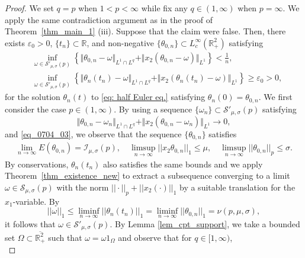 \documentclass[11pt]{amsart}
\theoremstyle{definition}
\theoremstyle{definition}
\numberwithin{equation}{section}
\newcommand{\nrm}[1]{\Vert#1\Vert}
\newcommand{\set}[1]{\{#1\}}
\newcommand{\0}{\emptyset}
\newcommand{\tht}{\theta}
\newcommand{\omg}{\omega}
\newcommand{\bbR}{\mathbb R}
\newcommand{\calI}{\mathcal I}
\newcommand{\calS}{\mathcal S}
\newcommand{\ift}{\infty}
\begin{document}
			
			
			\begin{proof}
            {We set $q = p$ when $1 < p < \infty$ while fix any $q \in (1, \infty)$ when $p = \infty$.}
				We apply the same contradiction argument as in the proof of Theorem~\ref{thm_main_1} (iii). Suppose that the claim were false. Then, there exists $\varepsilon_0>0$, $\set{t_n}\subset\bbR$, and non-negative $\{\tht_{0,n}\}\subset  L_c^\ift(\mathbb{R}^{2}_{+})$ satisfying 
				\begin{align*}
					&\inf_{\omg \in \calS'_{\mu,\sigma}(p)} \left\{ \nrm{\tht_{0,n}-\omg}_{L^{1}\cap L^{q}} +\nrm{x_2(\tht_{0,n}-\omg)}_{L^{1}}\right\}<\frac{1}{n}, \\
					&\inf_{\omg \in \calS'_{\mu,\sigma}(p)}\left\{\nrm{\tht_n(t_n)-\omg}_{L^{1}\cap L^{q}} + \nrm{x_2(\tht_n(t_n)-\omg )}_{L^{1}}\right\}\geq \varepsilon_0>0,
				\end{align*}
				for the solution $\tht_n(t)$ to 
                \eqref{eq: half Euler eq.}
                satisfying $\theta_n(0) =\tht_{0,n}$. We first consider the case $p\in (1,\infty)$. By using a sequence $\set{\omg_n}\subset \calS'_{\mu,\sigma}(p)$ satisfying
				\begin{equation*}
					\nrm{\tht_{0,n}-\omg_n}_{L^{1}\cap L^{q}} + \nrm{x_2(\tht_{0,n}-\omg_n)}_{L^{1}}\to 0, 
				\end{equation*}
				and \eqref{eq_0704_03}, we observe that the sequence $\{\theta_{0,n}\}$ satisfies 
				\begin{align*}
					\lim_{n\to\infty}E(\theta_{0,n})= \calI_{\mu,\sigma}(p),\quad 
					\limsup_{n\to\infty}||x_2\theta_{0,n}||_{1}\leq \mu,\quad 
					\limsup_{n\to\infty}||\theta_{0,n}||_{p}\leq \sigma.
				\end{align*}
				By conservations, $\theta_{n}(t_n)$ also satisfies the same {bounds} and we apply Theorem~\ref{thm_existence_new} to extract a subsequence converging to a limit $\omega\in \calS_{\mu,\sigma}(p)$ with the norm $||\cdot ||_{p}+||x_2(\cdot)||_{1}$ by a suitable translation for the $x_1$-variable.
				By
				\[
				||\omega||_1\leq \liminf_{n\to\infty}||\theta_n(t_n)||_{1}=\liminf_{n\to\infty}||\theta_{0,n}||_{1}= \nu(p, \mu, \sigma),
				\]
				it follows that $\omega\in \calS'_{\mu,\sigma}(p)$.
				By Lemma \ref{lem_cpt_support}, we take a bounded set $\Omega\subset \overline{\mathbb{R}^{2}_{+}}$ such that $\omega=\omega1_{\Omega}$ and observe that for $q\in [1,\infty)$,  
				\begin{equation}

\end{equation}
\end{proof}
\end{document}
